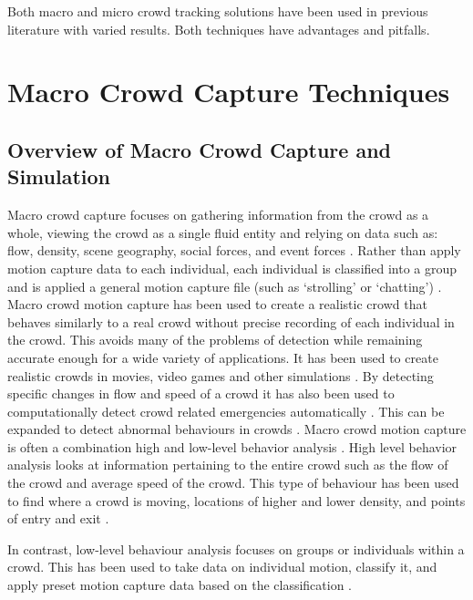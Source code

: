 \documentclass[12pt, onecolumn, conference]{IEEEtran}
\begin{document}
Both macro and micro crowd tracking solutions have been used in previous literature with varied results. Both techniques have advantages and pitfalls. 

\section{Macro Crowd Capture Techniques}

\subsection{Overview of Macro Crowd Capture and Simulation}

Macro crowd capture focuses on gathering information from the crowd as a whole, viewing the crowd as a single fluid entity and relying on data such as: flow, density, scene geography, social forces, and event forces \cite{N. Courty}\cite{B. Boghossian}\cite{R. Mehran}\cite{S. Saxena}. Rather than apply motion capture data to each individual, each individual is classified into a group and is applied a general motion capture file (such as ‘strolling’ or ‘chatting’) \cite{K. Lee}. Macro crowd motion capture has been used to create a realistic crowd that behaves similarly to a real crowd without precise recording of each individual in the crowd. This avoids many of the problems of detection while remaining accurate enough for a wide variety of applications. It has been used to create realistic crowds in movies, video games and other simulations \cite{N. Courty}\cite{R. Mehran}. By detecting specific changes in flow and speed of a crowd it has also been used to computationally detect crowd related emergencies automatically \cite{B. Boghossian}. This can be expanded to detect abnormal behaviours in crowds \cite{S. Saxena}.
Macro crowd motion capture is often a combination high and low-level behavior analysis \cite{K. Lee}. High level behavior analysis looks at information pertaining to the entire crowd such as the flow of the crowd and average speed of the crowd. This type of behaviour has been used to find where a crowd is moving, locations of higher and lower density, and points of entry and exit \cite{N. Courty}\cite{B. Boghossian}\cite{R. Mehran}\cite{M. Rodriguez}.

In contrast, low-level behaviour analysis focuses on groups or individuals within a crowd. This has been used to take data on individual motion, classify it, and apply preset motion capture data based on the classification \cite{K. Lee}\cite{S. Saxena}. 
\end{document}
